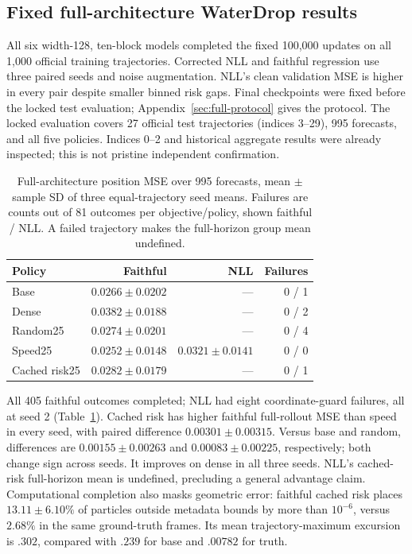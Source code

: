 \subsection{Fixed full-architecture WaterDrop results}
All six width-128, ten-block models completed the fixed 100,000 updates on all
1,000 official training trajectories. Corrected NLL and faithful regression use
three paired seeds and noise augmentation. NLL's clean validation MSE is higher
in every pair despite smaller binned risk gaps. Final checkpoints were fixed
before the locked test evaluation; Appendix~\ref{sec:full-protocol} gives the protocol.
The locked evaluation covers 27 official test trajectories (indices 3--29),
995 forecasts, and all five policies. Indices 0--2 and historical aggregate
results were already inspected; this is not pristine independent confirmation.

\begin{table}[t]
\centering\small
\caption{Full-architecture position MSE over 995 forecasts, mean $\pm$ sample SD of three equal-trajectory seed means. Failures are counts out of 81 outcomes per objective/policy, shown faithful / NLL. A failed trajectory makes the full-horizon group mean undefined.}
\label{tab:full-rollouts}
\begin{tabular}{lrrr}
\toprule
Policy & Faithful & NLL & Failures\\
\midrule
Base & $0.0266\pm0.0202$ & --- & 0 / 1\\
Dense & $0.0382\pm0.0188$ & --- & 0 / 2\\
Random25 & $0.0274\pm0.0201$ & --- & 0 / 4\\
Speed25 & $0.0252\pm0.0148$ & $0.0321\pm0.0141$ & 0 / 0\\
Cached risk25 & $0.0282\pm0.0179$ & --- & 0 / 1\\
\bottomrule
\end{tabular}
\end{table}

All 405 faithful outcomes completed; NLL had eight coordinate-guard failures,
all at seed 2 (Table~\ref{tab:full-rollouts}). Cached risk has higher faithful
full-rollout MSE than speed in every seed, with paired difference
$0.00301\pm0.00315$. Versus base and random, differences are
$0.00155\pm0.00263$ and $0.00083\pm0.00225$, respectively; both change sign
across seeds. It improves on dense in all three seeds. NLL's cached-risk
full-horizon mean is undefined, precluding a general advantage claim.
Computational completion also masks geometric error: faithful cached risk
places $13.11\pm6.10\%$ of particles outside metadata bounds by more than
$10^{-6}$, versus $2.68\%$ in the same ground-truth frames. Its mean trajectory-maximum
excursion is $.302$, compared with $.239$ for base and $.00782$ for truth.

